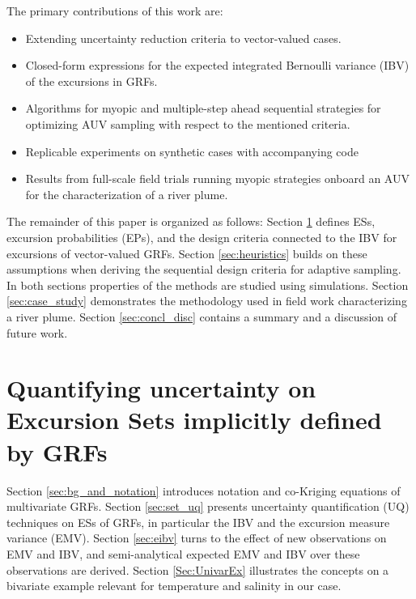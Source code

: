 \documentclass[aoas]{imsart}
\begin{document}
The primary contributions of this work are:

\begin{itemize}
\item Extending uncertainty reduction criteria to
  vector-valued cases.  
\item Closed-form expressions for the expected integrated Bernoulli
  variance (IBV) of the excursions in GRFs. 
\item Algorithms for myopic and multiple-step ahead sequential
  strategies for optimizing AUV sampling with respect to the mentioned
  criteria. 
\item Replicable experiments on synthetic cases with accompanying
  code
\item Results from full-scale field trials running myopic strategies onboard an AUV for the characterization of a river plume. 
\end{itemize}

The remainder of this paper is organized as follows:
Section \ref{sec:ESEP} defines ESs, excursion probabilities (EPs), and
the design criteria connected to the IBV for excursions of
vector-valued GRFs. Section \ref{sec:heuristics} builds on these
assumptions when deriving the sequential design criteria for adaptive
sampling. In both sections properties of the methods are studied using
simulations. Section \ref{sec:case_study} demonstrates the methodology
used in field work characterizing a river plume. Section
\ref{sec:concl_disc} contains a summary and a discussion of future
work.


\section{Quantifying uncertainty on Excursion Sets implicitly defined by GRFs}
\label{sec:ESEP}

Section \ref{sec:bg_and_notation} introduces notation and co-Kriging
equations of multivariate GRFs.  Section \ref{sec:set_uq} presents
uncertainty quantification (UQ) techniques on ESs of GRFs, in
particular the IBV and the excursion measure variance (EMV).  Section
\ref{sec:eibv} turns to the effect of new observations on EMV and IBV,
and semi-analytical expected EMV and IBV over these observations are
derived.
Section \ref{Sec:UnivarEx} illustrates the concepts on a bivariate
example relevant for temperature and salinity in our case.
\end{document}
